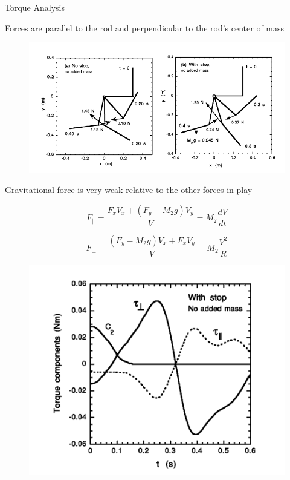 \documentclass[tikz]{beamer}
\begin{document}
\begin{frame} {Torque Analysis}

	 {
		Forces are parallel to the rod and perpendicular to the rod's center of mass
		\begin{figure}
			\centering
			\includegraphics[scale=0.4]{torque.png}
		\end{figure}
		Gravitational force is very weak relative to the other forces in play
	}

	 {
		\begin{equation}
			F_{\parallel}=\frac{F_x V_x + (F_y - M_2 g) V_y}{V} = M_2 \frac{dV}{dt} \tag{10}
		\end{equation}

		\begin{equation}
			F_{\perp}=\frac{(F_y - M_2 g)V_x+ F_x V_y}{V} = M_2 \frac{V^2}{R} \tag{11}
		\end{equation}

		\begin{figure}
			\centering
			\includegraphics[scale=0.4]{totaltorque.png}
		\end{figure}
	}


\end{frame}
\end{document}
